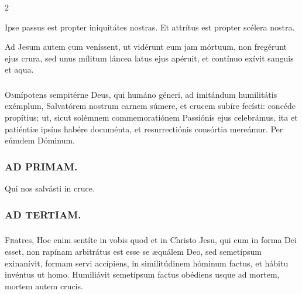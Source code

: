 \documentclass[9pt,twoside]{extarticle}
\begin{document}
\begin{multicols}{2}
\begin{tightlist}{}
\item {} Ipse passus est propter iniquitátes nostras.  Et attrítus est propter scélera nostra.
\item {} Ad Jesum autem cum veníssent, ut vidérunt eum jam mórtuum, non fregérunt ejus crura, sed unus mílitum láncea latus ejus apéruit, et contínuo exívit sanguis et aqua.
\end{tightlist}
\subsubsection*{\center{}}
\lettrine{O}mnípotens sempitérne Deus, qui humáno géneri, ad imitándum humilitátis exémplum, Salvatórem nostrum carnem súmere, et crucem subíre fecísti: concéde propítius; ut, sicut solémnem commemoratiónem Passiónis ejus celebrámus, ita et patiéntiæ ipsíus habére documénta, et resurrectiónis consórtia mereámur. Per eúmdem Dóminum.

\begin{tightlist}{}
\item {}
\end{tightlist}

\subsubsection*{\center \textsc{AD PRIMAM.}}
\begin{tightlist}{}
\item {} Qui nos salvásti in cruce.
\end{tightlist}

\subsubsection*{\center \textsc{AD TERTIAM.}}
\subsubsection*{}
\lettrine{F}ratres, Hoc enim sentíte in vobis quod et in Christo Jesu, qui cum in forma Dei esset, non rapínam arbitrátus est esse se æquálem Deo, sed semetípsum exinanívit, formam servi accípiens, in similitúdinem hóminum factus, et hábitu invéntus ut homo. Humiliávit semetípsum factus obédiens usque ad mortem, mortem autem crucis.


\end{multicols}
\end{document}
